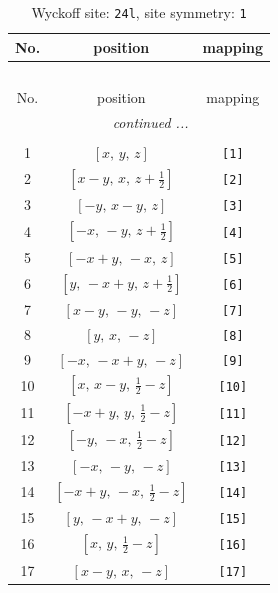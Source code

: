 \documentclass[fleqn,8pt]{jsarticle}
\begin{document}
\begin{longtable}{ccc}
\caption{Wyckoff site: {\tt 24l}, site symmetry: {\tt 1}}
 \\
 \hline \hline
No. & position & mapping \\ \hline \endfirsthead

\multicolumn{2}{l}{\tablename\ \thetable{}} \\
 \hline \hline
No. & position & mapping \\ \hline \endhead

 \hline \hline
\multicolumn{2}{r}{\footnotesize\it continued ...} \\ \endfoot

 \hline \hline
\multicolumn{2}{r}{} \\ \endlastfoot

1 & $\left[ x,\, y,\, z \right]$ & {\tt [1]} \\ \hline
2 & $\left[ x - y,\, x,\, z + \frac{1}{2} \right]$ & {\tt [2]} \\ \hline
3 & $\left[ - y,\, x - y,\, z \right]$ & {\tt [3]} \\ \hline
4 & $\left[ - x,\, - y,\, z + \frac{1}{2} \right]$ & {\tt [4]} \\ \hline
5 & $\left[ - x + y,\, - x,\, z \right]$ & {\tt [5]} \\ \hline
6 & $\left[ y,\, - x + y,\, z + \frac{1}{2} \right]$ & {\tt [6]} \\ \hline
7 & $\left[ x - y,\, - y,\, - z \right]$ & {\tt [7]} \\ \hline
8 & $\left[ y,\, x,\, - z \right]$ & {\tt [8]} \\ \hline
9 & $\left[ - x,\, - x + y,\, - z \right]$ & {\tt [9]} \\ \hline
10 & $\left[ x,\, x - y,\, \frac{1}{2} - z \right]$ & {\tt [10]} \\ \hline
11 & $\left[ - x + y,\, y,\, \frac{1}{2} - z \right]$ & {\tt [11]} \\ \hline
12 & $\left[ - y,\, - x,\, \frac{1}{2} - z \right]$ & {\tt [12]} \\ \hline
13 & $\left[ - x,\, - y,\, - z \right]$ & {\tt [13]} \\ \hline
14 & $\left[ - x + y,\, - x,\, \frac{1}{2} - z \right]$ & {\tt [14]} \\ \hline
15 & $\left[ y,\, - x + y,\, - z \right]$ & {\tt [15]} \\ \hline
16 & $\left[ x,\, y,\, \frac{1}{2} - z \right]$ & {\tt [16]} \\ \hline
17 & $\left[ x - y,\, x,\, - z \right]$ & {\tt [17]} \\ \hline

\end{longtable}
\end{document}
